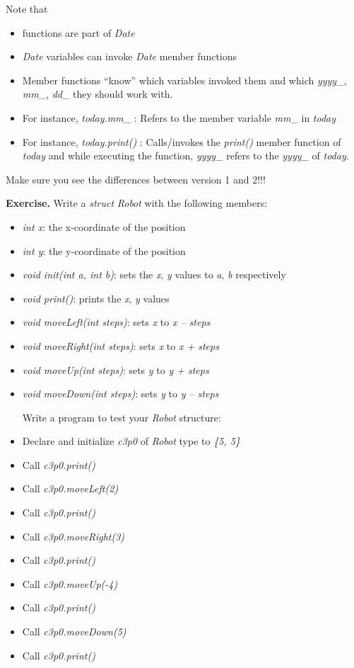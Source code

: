 \documentclass[
]{article}
\providecommand{\tightlist}{%
  \setlength{\itemsep}{0pt}\setlength{\parskip}{0pt}}
\begin{document}
Note that

\begin{itemize}
\tightlist
\item
  functions are part of \emph{Date}
\item
  \emph{Date} variables can invoke \emph{Date} member functions
\item
  Member functions ``know'' which variables invoked them and which
  \emph{yyyy\_}, \emph{mm\_}, \emph{dd\_} they should work with.
\item
  For instance, \emph{today.mm\_} : Refers to the member variable
  \emph{mm\_} in \emph{today}
\item
  For instance, \emph{today.print()} : Calls/invokes the \emph{print()}
  member function of \emph{today} and while executing the function,
  \emph{yyyy\_} refers to the \emph{yyyy\_} of \emph{today.}
\end{itemize}

Make sure you see the differences between version 1 and 2!!!

\textbf{Exercise.} Write a \emph{struct} \emph{Robot} with the following
members:

\begin{itemize}
\item
  \emph{int x}: the x-coordinate of the position
\item
  \emph{int y}: the y-coordinate of the position
\item
  \emph{void init(int a, int b)}: sets the \emph{x}, \emph{y} values to
  \emph{a}, \emph{b} respectively
\item
  \emph{void print()}: prints the \emph{x}, \emph{y} values
\item
  \emph{void moveLeft(int steps)}: sets \emph{x} to \emph{x -- steps}
\item
  \emph{void moveRight(int steps)}: sets \emph{x} to \emph{x + steps}
\item
  \emph{void moveUp(int steps)}: sets \emph{y} to \emph{y + steps}
\item
  \emph{void moveDown(int steps)}: sets \emph{y} to \emph{y -- steps}

  Write a program to test your \emph{Robot} structure:
\item
  Declare and initialize \emph{c3p0} of \emph{Robot} type to \emph{\{5,
  5\}}
\item
  Call \emph{c3p0.print()}
\item
  Call \emph{c3p0.moveLeft(2)}
\item
  Call \emph{c3p0.print()}
\item
  Call \emph{c3p0.moveRight(3)}
\item
  Call \emph{c3p0.print()}
\item
  Call \emph{c3p0.moveUp(-4)}
\item
  Call \emph{c3p0.print()}
\item
  Call \emph{c3p0.moveDown(5)}
\item
  Call \emph{c3p0.print()}
\end{itemize}
\end{document}
